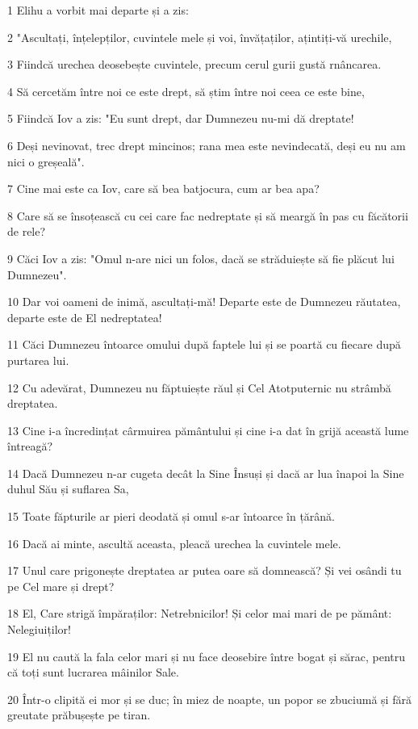 \par 1 Elihu a vorbit mai departe și a zis:
\par 2 "Ascultați, înțelepților, cuvintele mele și voi, învățaților, ațintiți-vă urechile,
\par 3 Fiindcă urechea deosebește cuvintele, precum cerul gurii gustă rnâncarea.
\par 4 Să cercetăm între noi ce este drept, să știm între noi ceea ce este bine,
\par 5 Fiindcă Iov a zis: "Eu sunt drept, dar Dumnezeu nu-mi dă dreptate!
\par 6 Deși nevinovat, trec drept mincinos; rana mea este nevindecată, deși eu nu am nici o greșeală".
\par 7 Cine mai este ca Iov, care să bea batjocura, cum ar bea apa?
\par 8 Care să se însoțească cu cei care fac nedreptate și să meargă în pas cu făcătorii de rele?
\par 9 Căci Iov a zis: "Omul n-are nici un folos, dacă se străduiește să fie plăcut lui Dumnezeu".
\par 10 Dar voi oameni de inimă, ascultați-mă! Departe este de Dumnezeu răutatea, departe este de El nedreptatea!
\par 11 Căci Dumnezeu întoarce omului după faptele lui și se poartă cu fiecare după purtarea lui.
\par 12 Cu adevărat, Dumnezeu nu făptuiește răul și Cel Atotputernic nu strâmbă dreptatea.
\par 13 Cine i-a încredințat cârmuirea pământului și cine i-a dat în grijă această lume întreagă?
\par 14 Dacă Dumnezeu n-ar cugeta decât la Sine Însuși și dacă ar lua înapoi la Sine duhul Său și suflarea Sa,
\par 15 Toate făpturile ar pieri deodată și omul s-ar întoarce în țărână.
\par 16 Dacă ai minte, ascultă aceasta, pleacă urechea la cuvintele mele.
\par 17 Unul care prigonește dreptatea ar putea oare să domnească? Și vei osândi tu pe Cel mare și drept?
\par 18 El, Care strigă împăraților: Netrebnicilor! Și celor mai mari de pe pământ: Nelegiuiților!
\par 19 El nu caută la fala celor mari și nu face deosebire între bogat și sărac, pentru că toți sunt lucrarea mâinilor Sale.
\par 20 Într-o clipită ei mor și se duc; în miez de noapte, un popor se zbuciumă și fără greutate prăbușește pe tiran.
